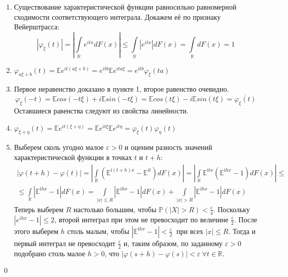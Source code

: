 \documentclass[oneside,final,14pt]{extreport}
\renewenvironment{proof}{{\bfseries Доказательство.}}{\qed}
\theoremstyle{plain}
\theoremstyle{definition}
\theoremstyle{named}
\begin{document}
\begin{proof}
    \begin{enumerate}
        \item Существование характеристической функции равносильно равномерной сходимости соответствующего интеграла. Докажем её по признаку Вейерштрасса:
        \begin{equation*}
            \left|\varphi_{\xi}(t)\right|=\left|\int\limits_{\mathbb{R}} e^{i t x} d F(x)\right| \leqslant \int\limits_{\mathbb{R}}\left|e^{i t x}\right| d F(x)=\int\limits_{\mathbb{R}} d F(x)=1
        \end{equation*}
        \item $\varphi_{a \xi+b}(t) 
        = \mathbb{E}e^{i t(a \xi+b)}
        = e^{i t b} \mathbb{E}e^{i t a \xi}
        = e^{i t b} \varphi_{\xi}(t a)$
        \item Первое неравенство доказано в пункте 1, второе равенство очевидно.
        \begin{equation*}
            \varphi_{\xi}(-t) = \mathbb{E}cos(-t \xi) + i\mathbb{E}sin(-t \xi) = \mathbb{E}cos(t \xi) - i\mathbb{E}sin(t \xi) = \overline{\varphi_{\xi}(t)}
        \end{equation*}
        Оставшиеся равенства следуют из свойства линейности.
        \item $\varphi_{\xi + \eta}(t) 
        = \mathbb{E}e^{it(\xi + \eta)} 
        = \mathbb{E}e^{it\xi}\mathbb{E}e^{it\eta}
        = \varphi_{\xi}(t)\varphi_{\eta}(t)$
        \item Выберем сколь угодно малое $\varepsilon > 0$ и оценим разность значений характеристической функции в точках $t$ и $t + h$:
        \begin{multline*}
            |\varphi(t+h)-\varphi(t)| 
            = \left|\int\limits_{\mathbb{R}} \left(\mathbb{E}^{\mathrm{i}(t+h) x}-\mathbb{E}^{\mathrm{i} t}\right) d F(x)\right|
            = \left|\int\limits_{\mathbb{R}} \mathbb{E}^{\mathrm{i} t x}\left(\mathbb{E}^{\mathrm{i} h x}-1\right) d F(x)\right| \leqslant \\
            \leqslant \int\limits_{\mathbb{R}} \left|\mathbb{E}^{\mathrm{i} h x}-1\right| d F(x)=\int\limits_{|x| \leqslant R}\left|\mathbb{E}^{\mathrm{i} h x}-1\right| d F(x)+\int\limits_{|x|>R}\left|\mathbb{E}^{\mathrm{i} h x}-1\right| d F(x)
        \end{multline*}
        Теперь выберем $R$ настолько большим, чтобы $\mathbb{P}(|X|>R) < \frac{\varepsilon}{4}$. Поскольку $\left|e^{i h x}-1\right| \leqslant 2$, второй интеграл при этом не превосходит по величине $\frac{\varepsilon}{2}$. После этого выберем $h$ столь малым, чтобы $\left|\mathbb{E}^{\mathrm{i} h x}-1\right|<\frac{\varepsilon}{2}~$ при всех $|x| \leqslant R$. Тогда и первый интеграл не превосходит $\frac{\varepsilon}{2}$ и, таким образом, по заданному $\varepsilon > 0$ подобрано столь малое $h >0$, что $|\varphi(s+h)-\varphi(s)|<\varepsilon~ \forall t \in \mathbb{R}$.

\end{enumerate}
\end{proof}
\end{document}
